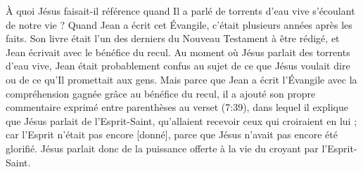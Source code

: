 À quoi Jésus faisait-il référence quand Il a parlé de
 \og torrents d'eau vive \fg{} s'écoulant de notre vie ?
 Quand Jean a écrit cet Évangile, c'était plusieurs années après les faits.
 Son livre était l'un des derniers du Nouveau Testament à être rédigé,
 et Jean écrivait avec le bénéfice du recul. Au moment où Jésus parlait
 des torrents d'eau vive, Jean était probablement confus au sujet de ce que
 Jésus voulait dire ou de ce qu'Il promettait aux gens.
 Mais parce que Jean a écrit l'Évangile avec la compréhension gagnée grâce
 au bénéfice du recul, il a ajouté son propre commentaire exprimé entre
 parenthèses au verset (7:39), dans lequel il explique que Jésus
 parlait de l'Esprit-Saint, \og qu'allaient recevoir ceux qui croiraient
 en lui ; car l'Esprit n'était pas encore [donné], parce que Jésus n'avait
 pas encore été glorifié. \fg{}
 Jésus parlait donc de la puissance offerte à la vie du croyant
 par l'Esprit-Saint.



\closechapter
